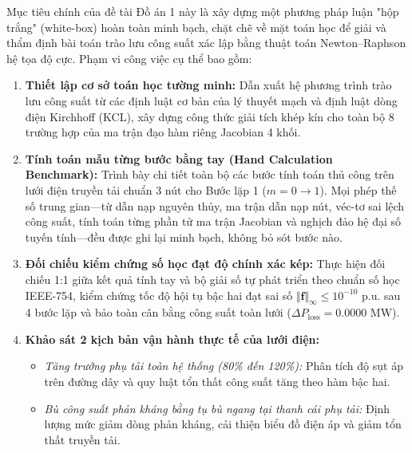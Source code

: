 \documentclass[12pt,a4paper,oneside]{report}
\begin{document}
Mục tiêu chính của đề tài Đồ án 1 này là xây dựng một phương pháp luận "hộp trắng" (white-box) hoàn toàn minh bạch, chặt chẽ về mặt toán học để giải và thẩm định bài toán trào lưu công suất xác lập bằng thuật toán Newton--Raphson hệ tọa độ cực. Phạm vi công việc cụ thể bao gồm:
\begin{enumerate}
    \item \textbf{Thiết lập cơ sở toán học tường minh:} Dẫn xuất hệ phương trình trào lưu công suất từ các định luật cơ bản của lý thuyết mạch và định luật dòng điện Kirchhoff (KCL), xây dựng công thức giải tích khép kín cho toàn bộ 8 trường hợp của ma trận đạo hàm riêng Jacobian 4 khối.
    \item \textbf{Tính toán mẫu từng bước bằng tay (Hand Calculation Benchmark):} Trình bày chi tiết toàn bộ các bước tính toán thủ công trên lưới điện truyền tải chuẩn 3 nút cho Bước lặp 1 ($m = 0 \to 1$). Mọi phép thế số trung gian---từ dẫn nạp nguyên thủy, ma trận dẫn nạp nút, véc-tơ sai lệch công suất, tính toán từng phần tử ma trận Jacobian và nghịch đảo hệ đại số tuyến tính---đều được ghi lại minh bạch, không bỏ sót bước nào.
    \item \textbf{Đối chiếu kiểm chứng số học đạt độ chính xác kép:} Thực hiện đối chiếu 1:1 giữa kết quả tính tay và bộ giải số tự phát triển theo chuẩn số học IEEE-754, kiểm chứng tốc độ hội tụ bậc hai đạt sai số $\Vert \mathbf{f} \Vert_\infty \le 10^{-10}\text{ p.u.}$ sau 4 bước lặp và bảo toàn cân bằng công suất toàn lưới ($\Delta P_{\text{loss}} = 0.0000\text{ MW}$).
    \item \textbf{Khảo sát 2 kịch bản vận hành thực tế của lưới điện:}
    \begin{itemize}
        \item \textit{Tăng trưởng phụ tải toàn hệ thống (80\% đến 120\%):} Phân tích độ sụt áp trên đường dây và quy luật tổn thất công suất tăng theo hàm bậc hai.
        \item \textit{Bù công suất phản kháng bằng tụ bù ngang tại thanh cái phụ tải:} Định lượng mức giảm dòng phản kháng, cải thiện biểu đồ điện áp và giảm tổn thất truyền tải.
    \end{itemize}
\end{enumerate}
\end{document}
